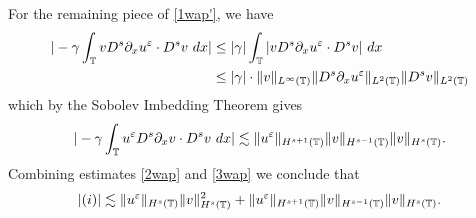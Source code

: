 	For the remaining piece of \eqref{1wap'}, we have
	\begin{equation*}
		\begin{split}
			| - \gamma \int_{\mathbb{T}} v D^s \partial_x u^\varepsilon \cdot D^s v \ dx |
			& \le |\gamma| \int_{\mathbb{T}} |v D^s \partial_x u^\varepsilon \cdot D^s v | \ dx
			\\
			& \le |\gamma| \cdot \|v\|_{L^\infty(\mathbb{T})} \|D^s \partial_x u^\varepsilon
			\|_{L^2(\mathbb{T})} \|D^s v\|_{L^2(\mathbb{T})}
		\end{split}
	\end{equation*}
	which by the Sobolev Imbedding Theorem gives 
	\begin{equation}
		\begin{split}
			| - \gamma \int_{\mathbb{T}} u^\varepsilon D^s \partial_x v \cdot D^s v \ dx |
			\lesssim \|u^\varepsilon \|_{H^{s+1}(\mathbb{T})} \|v\|_{H^{s-1}(\mathbb{T})}
			\|v\|_{H^s(\mathbb{T})}.
			\label{3wap}
		\end{split}
	\end{equation}
	Combining estimates \eqref{2wap} and \eqref{3wap} we conclude that
	\begin{equation}
		\begin{split}
			|(i)| \lesssim \|u^\varepsilon \|_{H^s(\mathbb{T})} \|v\|_{H^s(\mathbb{T})}^2 + 
			\|u^\varepsilon \|_{H^{s+1}(\mathbb{T})} \|v\|_{H^{s-1}(\mathbb{T})}
			\|v\|_{H^s(\mathbb{T})}.
			\label{4wap}
		\end{split}
	\end{equation}
%
